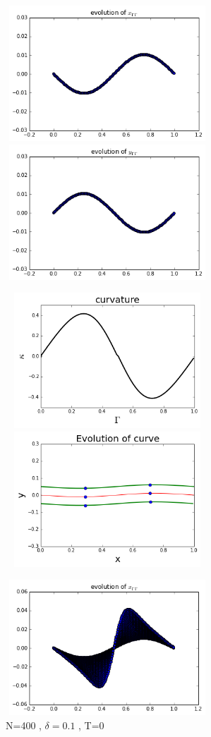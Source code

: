 \documentclass[12pt,twoside]{article}
\begin{document}
\begin{figure}[ht]
\centering
\begin{minipage}[b]{0.45\linewidth}
\includegraphics[width=3in,height=2in]{xppT0.png}


\includegraphics[width=3in,height=2in]{yppT0.png}

\includegraphics[width=3in,height=2in]{curvatureT0.png}
\includegraphics[width=3in,height=2in]{curveT0.png}
\caption{N=400 , $\delta=0.1$ , T=0}
\end{minipage}
\quad
\begin{minipage}[b]{0.45\linewidth}
\includegraphics[width=3in,height=2in]{xppT04.png}


\end{minipage}
\end{figure}
\end{document}
